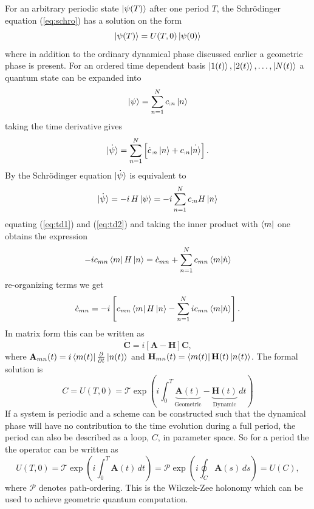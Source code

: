 For an arbitrary periodic state $\ket{\psi(T)}$ after one period $T$, the Schrödinger equation (\ref{eq:schro}) has a solution on the form 
\begin{equation}
\label{eq:gen_sol}
\ket{\psi(T)} = U(T,0)\ket{\psi(0)}
\end{equation}
where in addition to the ordinary dynamical phase discussed earlier a geometric phase is present. For an ordered time dependent basis $\ket{1(t)}, \ket{2(t)},\dots, \ket{N(t)}$ a quantum state can be expanded into 
\begin{equation}
\ket{\psi} = \sum_{n = 1}^N c_{:n}\ket{n}
\end{equation}
taking the time derivative gives
\begin{equation}
\label{eq:td1}
\dot{\ket{\psi}} = \sum_{n = 1}^N \left[\dot{c}_{:n}\ket{n} + c_{:n}\dot{\ket{n}} \right].
\end{equation}
By the Schrödinger equation $\dot{\ket{\psi}}$ is equivalent to
\begin{equation}
\label{eq:td2}
\dot{\ket{\psi}} = -i\,H\ket{\psi} = -i\sum_{n = 1}^N c_{:n}H\ket{n}
\end{equation}
equating (\ref{eq:td1}) and (\ref{eq:td2}) and taking the inner product with $\bra{m}$ one obtains the expression
\begin{equation}
-i c_{mn}\bra{m}H\ket{n} = \dot{c}_{mn} + \sum_{n = 1}^N c_{mn} \bra{m}\ket{\dot{n}}
\end{equation}
re-organizing terms we get 
\begin{equation}
\dot{c}_{mn} = -i\left[c_{mn}\bra{m}H\ket{n} - \sum_{n = 1}^N i c_{mn} \bra{m}\ket{\dot{n}} \right].
\end{equation}
In matrix form this can be written as 
\begin{equation}
\dot{\mathbf{C}} = i\left[\mathbf{A} - \mathbf{H} \right]\mathbf{C},
\end{equation}
where $\mathbf{A}_{mn}(t) = i\bra{m(t)}\pdv{}{t}\ket{n(t)}$ and
$\mathbf{H}_{mn}(t) = \bra{m(t)}\mathbf{H}(t)\ket{n(t)}$. The formal solution is 
\begin{equation}
\label{eq:unitary}
C = U(T,0) = \mathcal{T}\exp\left(i\int_{0}^{T} \underbrace{\mathbf{A}(t)}_{\text{Geometric}} - \underbrace{\mathbf{H}(t)}_{\text{Dynamic}}\,dt\right)
\end{equation}
If a system is periodic and a scheme can be constructed such that the dynamical phase will have no contribution to the time evolution during a full period, the period can also be described as a loop, $C$, in parameter space. So for a period the the operator can be written as
\begin{equation}
U(T,0) = \mathcal{T}\exp\left(i\int_{0}^{T}\mathbf{A}(t)\,dt\right) = \mathcal{P}\exp\left(i\oint_{C}\mathbf{A}(s)\,ds\right) = U(C),
\end{equation}
where $\mathcal{P}$ denotes path-ordering. This is the Wilczek-Zee holonomy which can be used to achieve geometric quantum computation. 

